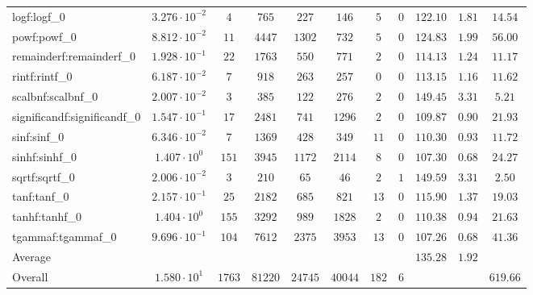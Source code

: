 \begin{tabular}{|l|c|c|c|c|c|c|c|c|c|c|}
logf:logf\_0                 & $ 3.276 \cdot 10^{-2} $ & $ 4      $ & $ 765   $ & $ 227   $ & $ 146   $ & $ 5   $ & $ 0 $ & $ 122.10      $ & $ 1.81    $ & $ 14.54   $ \\
powf:powf\_0                 & $ 8.812 \cdot 10^{-2} $ & $ 11     $ & $ 4447  $ & $ 1302  $ & $ 732   $ & $ 5   $ & $ 0 $ & $ 124.83      $ & $ 1.99    $ & $ 56.00   $ \\
remainderf:remainderf\_0     & $ 1.928 \cdot 10^{-1} $ & $ 22     $ & $ 1763  $ & $ 550   $ & $ 771   $ & $ 2   $ & $ 0 $ & $ 114.13      $ & $ 1.24    $ & $ 11.17   $ \\
rintf:rintf\_0               & $ 6.187 \cdot 10^{-2} $ & $ 7      $ & $ 918   $ & $ 263   $ & $ 257   $ & $ 0   $ & $ 0 $ & $ 113.15      $ & $ 1.16    $ & $ 11.62   $ \\
scalbnf:scalbnf\_0           & $ 2.007 \cdot 10^{-2} $ & $ 3      $ & $ 385   $ & $ 122   $ & $ 276   $ & $ 2   $ & $ 0 $ & $ 149.45      $ & $ 3.31    $ & $ 5.21    $ \\
significandf:significandf\_0 & $ 1.547 \cdot 10^{-1} $ & $ 17     $ & $ 2481  $ & $ 741   $ & $ 1296  $ & $ 2   $ & $ 0 $ & $ 109.87      $ & $ 0.90    $ & $ 21.93   $ \\
sinf:sinf\_0                 & $ 6.346 \cdot 10^{-2} $ & $ 7      $ & $ 1369  $ & $ 428   $ & $ 349   $ & $ 11  $ & $ 0 $ & $ 110.30      $ & $ 0.93    $ & $ 11.72   $ \\
sinhf:sinhf\_0               & $ 1.407 \cdot 10^{0}  $ & $ 151    $ & $ 3945  $ & $ 1172  $ & $ 2114  $ & $ 8   $ & $ 0 $ & $ 107.30      $ & $ 0.68    $ & $ 24.27   $ \\
sqrtf:sqrtf\_0               & $ 2.006 \cdot 10^{-2} $ & $ 3      $ & $ 210   $ & $ 65    $ & $ 46    $ & $ 2   $ & $ 1 $ & $ 149.59      $ & $ 3.31    $ & $ 2.50    $ \\
tanf:tanf\_0                 & $ 2.157 \cdot 10^{-1} $ & $ 25     $ & $ 2182  $ & $ 685   $ & $ 821   $ & $ 13  $ & $ 0 $ & $ 115.90      $ & $ 1.37    $ & $ 19.03   $ \\
tanhf:tanhf\_0               & $ 1.404 \cdot 10^{0}  $ & $ 155    $ & $ 3292  $ & $ 989   $ & $ 1828  $ & $ 2   $ & $ 0 $ & $ 110.38      $ & $ 0.94    $ & $ 21.63   $ \\
tgammaf:tgammaf\_0           & $ 9.696 \cdot 10^{-1} $ & $ 104    $ & $ 7612  $ & $ 2375  $ & $ 3953  $ & $ 13  $ & $ 0 $ & $ 107.26      $ & $ 0.68    $ & $ 41.36   $ \\
\hline
Average                      & $                     $ & $        $ & $       $ & $       $ & $       $ & $     $ & $   $ & $ 135.28      $ & $ 1.92    $ & $         $ \\
\hline
Overall                      & $ 1.580 \cdot 10^{1}  $ & $ 1763   $ & $ 81220 $ & $ 24745 $ & $ 40044 $ & $ 182 $ & $ 6 $ & $             $ & $         $ & $ 619.66  $ \\
\hline
\end{tabular}
